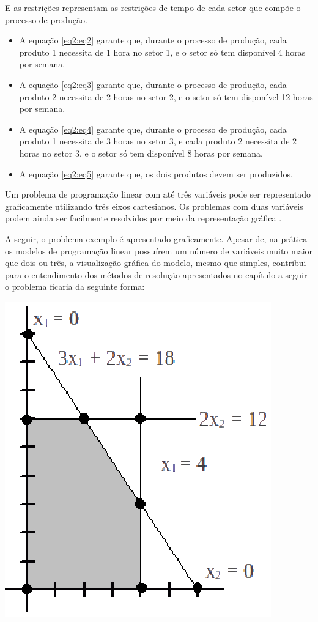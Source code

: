 E as restrições representam as restrições de tempo de cada setor que compõe o processo de produção.
\begin{itemize}
\item A equação \ref{eq2:eq2} garante que, durante o processo de produção, cada produto 1 necessita de 1 hora no setor 1, e o setor só tem disponível 4 horas por semana.
\item A equação \ref{eq2:eq3} garante que, durante o processo de produção, cada produto 2 necessita de 2 horas no setor 2, e o setor só tem disponível 12 horas por semana.
\item A equação \ref{eq2:eq4} garante que, durante o processo de produção, cada produto 1 necessita de 3 horas no setor 3, e cada produto 2 necessita de 2 horas no setor 3, e o setor só tem disponível 8 horas por semana.
\item A equação \ref{eq2:eq5} garante que, os dois produtos devem ser produzidos.
\end{itemize}

Um problema de programação linear com até três variáveis pode ser representado graficamente utilizando três eixos cartesianos. Os problemas com duas variáveis podem ainda ser facilmente resolvidos por meio da representação gráfica \cite{Passos}. 

A seguir, o problema exemplo é apresentado graficamente. Apesar de, na prática os modelos de programação linear possuírem um número de variáveis muito maior que dois ou três, a visualização gráfica do modelo, mesmo que simples, contribui para o entendimento dos métodos de resolução apresentados no capítulo a seguir
 o problema ficaria da seguinte forma:
\begin{center}
	\includegraphics[scale=1.0]{graficos/simplex_graf}
	\label{img:simplex_grafico}
\end{center}

